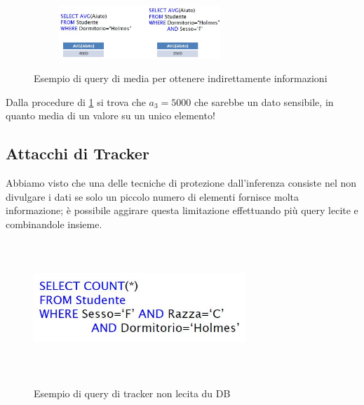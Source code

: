 \begin{figure}[htpb]
	\centering

		{\includegraphics[height=2cm, width=8cm, keepaspectratio]{Immagini/Appendice1/prot_dati_10.jpg}}
		
		
		
		\caption{Esempio di query di media per ottenere indirettamente informazioni 
		  \label{fig:query_media}}  

\end{figure}

Dalla procedure di \ref{fig:query_media} si trova che $ a_{3} = 5000 $ che sarebbe un dato sensibile, in quanto media di un valore su un unico elemento!

\subsection{Attacchi di Tracker}
Abbiamo visto che una delle tecniche di protezione dall'inferenza consiste nel non divulgare i dati se solo un piccolo numero di elementi fornisce molta informazione; è possibile aggirare questa limitazione effettuando più query lecite e combinandole insieme. 

\begin{figure}[htpb]
\centering

	{\includegraphics[height=5cm, width=8cm, keepaspectratio]{Immagini/Appendice1/prot_dati_13.jpg}}
		\caption{Esempio di query di tracker non lecita du DB
				  \label{fig:query_tracker_sbagliata}}  
\end{figure}

